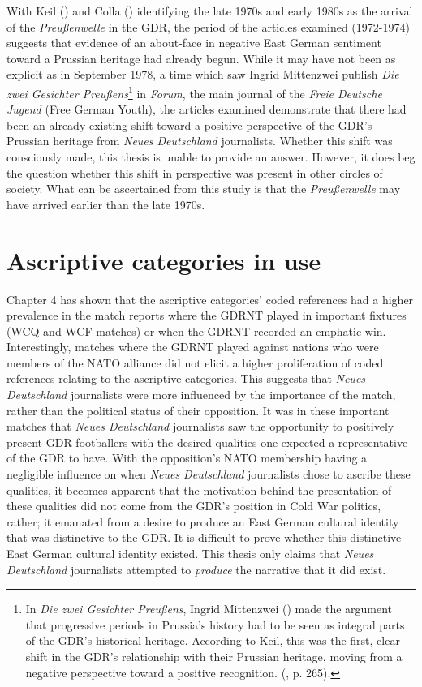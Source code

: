 With Keil (\citeyear{keil2016}) and Colla (\citeyear{colla2019}) identifying the late 1970s and early 1980s as the arrival of the \textit{Preußenwelle} in the GDR, the period of the articles examined (1972-1974) suggests that evidence of an about-face in negative East German sentiment toward a Prussian heritage had already begun. While it may have not been as explicit as in September 1978, a time which saw Ingrid Mittenzwei publish \textit{Die zwei Gesichter Preußens}\footnote{In \textit{Die zwei Gesichter Preußens}, Ingrid Mittenzwei (\citeyear{mittenzwei1978}) made the argument that progressive periods in Prussia’s history had to be seen as integral parts of the GDR’s historical heritage. According to Keil, this was the first, clear shift in the GDR’s relationship with their Prussian heritage, moving from a negative perspective toward a positive recognition.  (\cite{keil2016}, p. 265).} in \textit{Forum}, the main journal of the \textit{Freie Deutsche Jugend} (Free German Youth), the articles examined demonstrate that there had been an already existing shift toward a positive perspective of the GDR’s Prussian heritage from \textit{Neues Deutschland} journalists. Whether this shift was consciously made, this thesis is unable to provide an answer. However, it does beg the question whether this shift in perspective was present in other circles of society. What can be ascertained from this study is that the \textit{Preußenwelle} may have arrived earlier than the late 1970s.

\section*{Ascriptive categories in use}

Chapter 4 has shown that the ascriptive categories’ coded references had a higher prevalence in the match reports where the GDRNT played in important fixtures (WCQ and WCF matches) or when the GDRNT recorded an emphatic win. Interestingly, matches where the GDRNT played against nations who were members of the NATO alliance did not elicit a higher proliferation of coded references relating to the ascriptive categories. This suggests that \textit{Neues Deutschland} journalists were more influenced by the importance of the match, rather than the political status of their opposition. It was in these important matches that \textit{Neues Deutschland} journalists saw the opportunity to positively present GDR footballers with the desired qualities one expected a representative of the GDR to have. With the opposition’s NATO membership having a negligible influence on when \textit{Neues Deutschland} journalists chose to ascribe these qualities, it becomes apparent that the motivation behind the presentation of these qualities did not come from the GDR’s position in Cold War politics, rather; it emanated from a desire to produce an East German cultural identity that was distinctive to the GDR. It is difficult to prove whether this distinctive East German cultural identity existed. This thesis only claims that \textit{Neues Deutschland} journalists attempted to \textit{produce} the narrative that it did exist.

